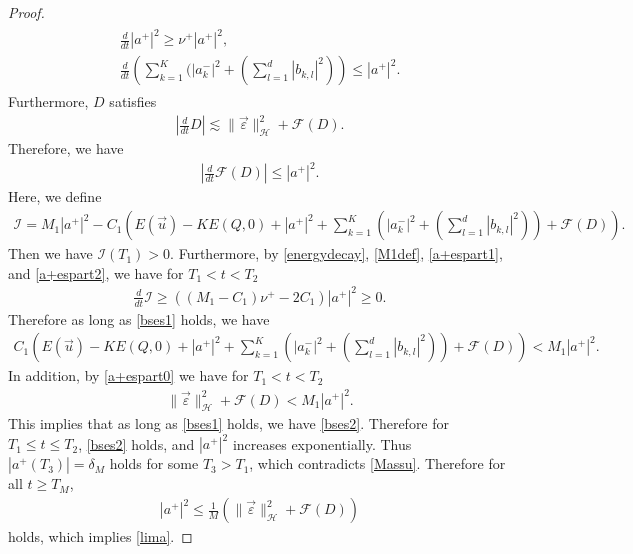 \documentclass[reqno]{amsart}
\theoremstyle{plain}
\theoremstyle{definition}
\numberwithin{equation}{section}
\newcommand{\1}{\mathbbm{1}}
\begin{document}
\begin{proof}
\begin{align}\label{a+espart1}
\begin{aligned}
\frac{d}{dt}|a^+|^2\geq \nu^+|a^+|^2,
\\
\frac{d}{dt}\left(\sum_{k=1}^K(|a_k^-|^2+(\sum_{l=1}^d|b_{k,l}|^2)\right)\leq |a^+|^2.
\end{aligned}
\end{align}
Furthermore, $D$ satisfies
\begin{align*}
\left| \frac{d}{dt}D\right|\lesssim \|\vec{\varepsilon}\|_{\mathcal{H}}^2+\mathcal{F}(D).
\end{align*}
Therefore, we have
\begin{align}\label{a+espart2}
\left| \frac{d}{dt}\mathcal{F}(D)\right|\leq |a^+|^2.
\end{align}
Here, we define
\begin{align*}
\mathcal{I}=M_1|a^+|^2- C_1\left(E(\vec{u})-KE(Q,0)+|a^+|^2+\sum_{k=1}^K(|a_k^-|^2+(\sum_{l=1}^d|b_{k,l}|^2))+\mathcal{F}(D)\right).
\end{align*}
Then we have $\mathcal{I}(T_1)>0$. Furthermore, by \eqref{energydecay}, \eqref{M1def}, \eqref{a+espart1}, and \eqref{a+espart2}, we have for $T_1<t<T_2$
\begin{align*}
\frac{d}{dt}\mathcal{I}\geq \left( (M_1-C_1)\nu^+-2C_1\right)|a^+|^2\geq 0.
\end{align*}
Therefore as long as \eqref{bses1} holds, we have
\begin{align*}
C_1\left(E(\vec{u})-KE(Q,0)+|a^+|^2+\sum_{k=1}^K(|a_k^-|^2+(\sum_{l=1}^d|b_{k,l}|^2))+\mathcal{F}(D)\right)<M_1|a^+|^2.
\end{align*} 
In addition, by \eqref{a+espart0} we have for $T_1<t<T_2$
\begin{align}\label{bses2}
\|\vec{\varepsilon}\|_{\mathcal{H}}^2+\mathcal{F}(D)<M_1|a^+|^2.
\end{align}
This implies that as long as \eqref{bses1} holds, we have \eqref{bses2}. Therefore for $T_1\leq t\leq T_2$, \eqref{bses2} holds, and $|a^+|^2$ increases exponentially. Thus $|a^+(T_3)|=\delta_M$ holds for some $T_3>T_1$, which contradicts \eqref{Massu}. Therefore for all $t\geq T_M$,
\begin{align*}
|a^+|^2\leq \frac{1}{M}\left( \|\vec{\varepsilon}\|_{\mathcal{H}}^2+\mathcal{F}(D)\right)
\end{align*}
holds, which implies \eqref{lima}.
\end{proof}
\end{document}
